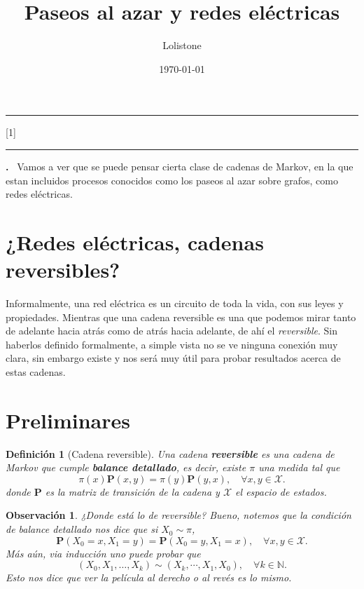 \documentclass[11pt,a4paper]{article}
\title{Paseos al azar y redes eléctricas}
\author{Lolistone
}
\date{\today}
\makeatletter
\newcommand{\LPscale}{0.8}
\newlength{\LPw}
\newcommand{\LPsetwidth}[1]{\setlength{\LPw}{\dimexpr 5\dimexpr #1\relax/4\relax}}
\newcommand{\LPhead}{\normalfont\bfseries}
\newcommand{\N}{\mathbb{N}}
\newcommand{\Prob}{\textbf{P}}
\newcommand{\defn}[1]{\textbf{\emph{#1}}}
\numberwithin{equation}{section}
\theoremstyle{LPplain}
\theoremstyle{LPdef}
\newtheorem{defi}[teo]{Definición}
\theoremstyle{LPrem}
\newtheorem{obs}[teo]{Observación}
\renewcommand{\maketitle}{%
  \thispagestyle{plain}%
  \begin{center}
    \textcolor{LPgray}{\rule{\textwidth}{0.4pt}}\par
    \vspace{1.2em}
    \LPsetwidth{\textwidth}%
    \scalebox{\LPscale}[1]{\parbox[t]{\LPw}{\centering
      \LPhead\fontsize{28}{31}\selectfont \@title\par}}\par
    \vspace{1em}
    {\large \@author\par}
    \vspace{0.3em}
    {\normalsize \@date\par}
    \vspace{1em}
    \textcolor{LPgray}{\rule{\textwidth}{0.4pt}}\par
  \end{center}
  \vspace{1em}}
\renewenvironment{abstract}{%
  \begin{center}\begin{minipage}{0.86\textwidth}
  \small\noindent\textbf{\abstractname.}\ }{%
  \end{minipage}\end{center}\vspace{0.5em}}
\makeatother
\begin{document}
\maketitle

\begin{abstract}
    Vamos a ver que se puede pensar cierta clase de cadenas de Markov, en la que estan 
    incluidos procesos conocidos como los paseos al azar sobre grafos, como redes eléctricas.
\end{abstract}


\section{¿Redes eléctricas, cadenas reversibles?}

  Informalmente, una red eléctrica es un circuito de toda la vida, con
  sus leyes y propiedades. Mientras que una cadena reversible es una que 
  podemos mirar tanto de adelante hacia atrás como de atrás hacia adelante,
  de ahí el \emph{reversible}. Sin haberlos definido formalmente, a simple 
  vista no se ve ninguna conexión muy clara, sin embargo existe y nos será
  muy útil para probar resultados acerca de estas cadenas. 

\section{Preliminares}

\begin{defi}[Cadena reversible]
  Una cadena \defn{reversible} es una cadena de Markov que cumple 
  \defn{balance detallado}, es decir, existe $\pi$ una medida tal que
  \begin{equation}\label{eq:bd}
   \pi(x)\Prob(x,y) = \pi(y)\Prob(y,x), \quad \forall x,y \in \mathcal{X}.
  \end{equation}
   donde $\Prob$ es la matriz de transición de la cadena y $\mathcal{X}$ el espacio
  de estados.
\end{defi}

\begin{obs}
  ¿Donde está lo de reversible? Bueno, notemos que la condición de balance detallado
  nos dice que si $X_0 \sim \pi$,
  $$\Prob(X_0 = x, X_1 = y) = \Prob(X_0 = y, X_1 = x), \quad \forall x,y \in \mathcal{X}.$$
  Más aún, via inducción uno puede probar que 
  $$(X_0, X_1, \dots, X_k) \sim (X_k, \cdots, X_1, X_0), \quad \forall k \in \N.$$
  Esto nos dice que ver la película al derecho o al revés es lo mismo.
\end{obs}
\end{document}

